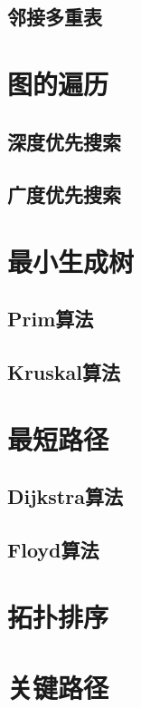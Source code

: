 \documentclass[lang=cn,newtx,10pt,scheme=chinese]{elegantbook}
\begin{document}
\subsection{邻接多重表}

\section{图的遍历}

\subsection{深度优先搜索}

\subsection{广度优先搜索}

\section{最小生成树}

\subsection{Prim算法}

\subsection{Kruskal算法}

\section{最短路径}

\subsection{Dijkstra算法}

\subsection{Floyd算法}

\section{拓扑排序}

\section{关键路径}
\end{document}
